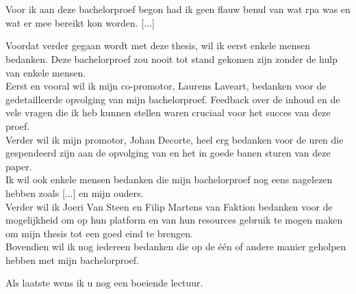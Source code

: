 
\chapter*{}
\label{ch:voorwoord}

Voor ik aan deze bachelorproef begon had ik geen flauw benul van wat \acrlong{rpa} was en wat er mee bereikt kon worden. [...]

Voordat verder gegaan wordt met deze thesis, wil ik eerst enkele mensen bedanken. Deze bachelorproef zou nooit tot stand gekomen zijn zonder de hulp van enkele mensen.\\
Eerst en vooral wil ik mijn co-promotor, Laurens Laveart, bedanken voor de gedetailleerde
opvolging van mijn bachelorproef. Feedback over de inhoud en de vele vragen die ik heb kunnen stellen waren cruciaal voor het succes van deze proef.\\
Verder wil ik mijn promotor, Johan Decorte, heel erg bedanken voor de uren die
gespendeerd zijn aan de opvolging van en het in goede banen sturen van deze paper.\\
Ik wil ook enkele mensen bedanken die mijn bachelorproef nog eens nagelezen hebben
zoals [...] en mijn ouders.\\
Verder wil ik Joeri Van Steen en Filip Martens van Faktion bedanken voor de mogelijkheid om op hun platform en van hun resources gebruik te mogen maken om mijn thesis tot een goed eind te brengen. \\
Bovendien wil ik nog iedereen bedanken die op de één of andere manier geholpen hebben
met mijn bachelorproef.

Als laatste wens ik u nog een boeiende lectuur.

